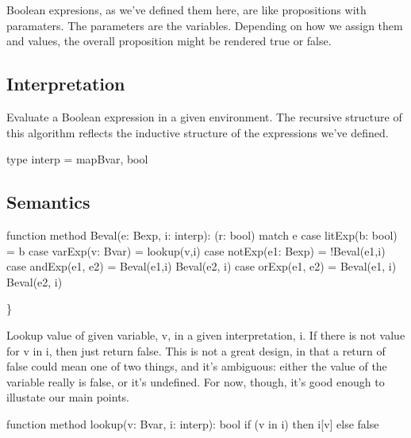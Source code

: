 \documentclass[letterpaper,10pt,english]{sphinxmanual}
\begin{document}
Boolean expresions, as we’ve defined them here, are like propositions
with paramaters. The parameters are the variables. Depending on how we
assign them  and  values, the overall proposition might be
rendered true or false.


\subsection{Interpretation}
\label{\detokenize{11-propositional-logic:interpretation}}
Evaluate a Boolean expression in a given environment.  The recursive
structure of this algorithm reflects the inductive structure of the
expressions we’ve defined.

\begin{sphinxVerbatim}[commandchars=\\\{\}]
type interp = map\PYGZlt{}Bvar, bool\PYGZgt{}
\end{sphinxVerbatim}


\subsection{Semantics}
\label{\detokenize{11-propositional-logic:semantics}}
\begin{sphinxVerbatim}[commandchars=\\\{\}]
function method Beval(e: Bexp, i: interp): (r: bool)
\PYGZob{}
    match e
    \PYGZob{}
        case litExp(b: bool) =\PYGZgt{} b
        case varExp(v: Bvar) =\PYGZgt{} lookup(v,i)
        case notExp(e1: Bexp) =\PYGZgt{} !Beval(e1,i)
        case andExp(e1, e2) =\PYGZgt{} Beval(e1,i) \PYGZam{}\PYGZam{} Beval(e2, i)
        case orExp(e1, e2) =\PYGZgt{}  Beval(e1, i) \textbar{}\textbar{} Beval(e2, i)
    \PYGZcb{}
\PYGZcb{}
\end{sphinxVerbatim}

\}

Lookup value of given variable, v, in a given interpretation, i. If
there is not value for v in i, then just return false. This is not a
great design, in that a return of false could mean one of two things,
and it’s ambiguous: either the value of the variable really is false,
or it’s undefined.  For now, though, it’s good enough to illustate our
main points.

\begin{sphinxVerbatim}[commandchars=\\\{\}]
function method lookup(v: Bvar, i: interp): bool
\PYGZob{}
    if (v in i) then i[v]
    else false
\PYGZcb{}
\end{sphinxVerbatim}
\end{document}

